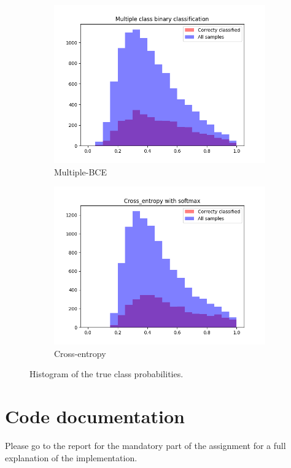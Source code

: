\documentclass[a4paper]{article}
\begin{document}
\begin{figure}[h]
	\centering
	\begin{subfigure}{\textwidth}
		\centering
		\includegraphics[width=.6\linewidth]{images/mbce_lamb0.png}
		\caption{Multiple-BCE}
	\end{subfigure}
	\begin{subfigure}{\textwidth}
		\centering
		\includegraphics[width=.6\linewidth]{images/simple_lamda0.png}
		\caption{Cross-entropy}
	\end{subfigure}
	
	\caption{Histogram of the true class probabilities.}
	\label{fig:mbce_hist}
\end{figure}


\section*{Code documentation}
Please go to the report for the mandatory part of the assignment for a full explanation of the implementation.


\end{document}
